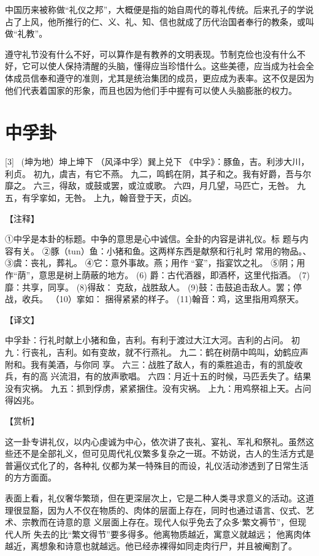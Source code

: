 \documentclass[12pt,UTF8]{ctexbook}
\begin{document}
中国历来被称做“礼仪之邦”，大概便是指的始自周代的尊礼传统。后来孔子的学说占了上风，他所推行的仁、义、礼、知、信也就成了历代治国者奉行的教条，或叫做“礼教”。

遵守礼节没有什么不好，可以算作是有教养的文明表现。节制克俭也没有什么不好，它可以使人保持清醒的头脑，懂得应当珍惜什么。这些美德，应当成为社会全体成员信奉和遵守的准则，尤其是统治集团的成员，更应成为表率。这不仅是因为他们代表着国家的形象，而且也因为他们手中握有可以使人头脑膨胀的权力。

\chapter{中孚卦}
[3] \ (坤为地）坤上坤下
（风泽中孚）巽上兑下
《中孚》：豚鱼，吉。利涉大川，利贞。
初九，虞吉，有它不燕。
九二，鸣鹤在阴，其子和之。我有好爵，吾与尔靡之。
六三，得敌，或鼓或罢，或泣或歌。
六四，月几望，马匹亡，无咎。
九五，有孚挛如，无咎。
上九，翰音登于天，贞凶。

【注释】

①中孚是本卦的标题。中争的意思是心中诚信。全卦的内容是讲礼仪。标 题与内容有关。
②豚（tun）鱼：小猪和鱼。这两样东西是献祭和行礼时 常用的物品。、
③虞：丧礼，葬礼。
④它：意外事故。燕；用作 “宴”，指宴饮之礼。
⑤阴；用作“荫”，意思是树上荫蔽的地方。
(6) 爵：古代酒器，即酒杯，这里代指酒。
(7)靡：共享，同享。
(8)得敌： 克敌，战胜敌人。
(9)鼓：击鼓追击敌人。罢；停战，收兵。
（10）挛如： 捆得紧紧的样子。
(11)翰音：鸡，这里指用鸡祭天。

【译文】

中孚卦：行礼时献上小猪和鱼，吉利。有利于渡过大江大河。吉利的占问。
初九：行丧礼，吉利。如有变故，就不行燕礼。
九二：鹤在树荫中鸣叫，幼鹤应声附和。我有美酒，与你同 享。
六三：战胜了敌人，有的乘胜追击，有的凯旋收兵，有的高 兴流泪，有的放声歌唱。
六四：月近十五的时候，马匹丢失了。结果没有灾祸。
九五：抓到俘虏，紧紧捆住。没有灾祸。
上九：用鸡祭祖上天。占问得凶兆。

【赏析】

这一卦专讲礼仪，以内心虔诚为中心，依次讲了丧礼、宴礼、军礼和祭礼。虽然这些还不是全部礼义，但可见周代礼仪繁多复杂之一斑。不妨说，古人的生活方式是普遍仪式化了的，各种礼 仪都为某一特殊目的而设，礼仪活动渗透到了日常生活的方方面面。

表面上看，礼仪奢华繁琐，但在更深层次上，它是二种人类寻求意义的活动。这道理很显豁，因为人不仅在物质的、肉体的层面上存在，同时也通过语言、仪式、艺术、宗教而在诗意的意 义层面上存在。现代人似乎免去了众多‘繁文褥节”，但现代人所 失去的比“繁文得节”要多得多。他离物质越近，寓意义就越远； 他离肉体越近，离想象和诗意也就越远。他已经赤裸得如同走肉行尸，并且被阉割了。
\end{document}
